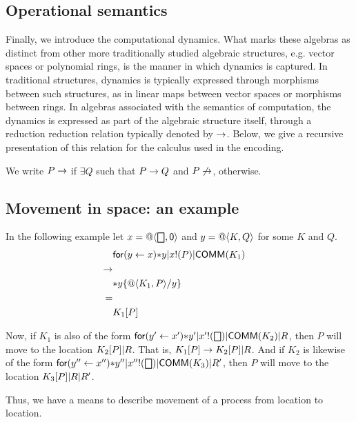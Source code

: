 \subsection{Operational semantics}

Finally, we introduce the computational dynamics. What marks these
algebras as distinct from other more traditionally studied algebraic
structures, e.g. vector spaces or polynomial rings, is the manner in
which dynamics is captured. In traditional structures, dynamics is typically
expressed through morphisms between such structures, as in linear maps
between vector spaces or morphisms between rings. In algebras
associated with the semantics of computation, the dynamics is
expressed as part of the algebraic structure itself, through a
reduction reduction relation typically denoted by $\red$. Below, we
give a recursive presentation of this relation for the calculus used
in the encoding.


We write $P\red$ if $\exists Q $ such that $ P \red Q$ and $P\not\red$, otherwise.

\subsection{ Movement in space: an example }
In the following example let $x = \spacen{\bigbox}{\pzero}$ and $y = \spacen{K}{Q}$ for some $K$ and $Q$.
\begin{eqnarray*}
  & \binpar{\binpar{\prefix{x}{y}{\dropn{y}}}{\outputp{x}{P}}}{\mathsf{COMM}(K_{1})} & \\
  \red & & \\
  & \dropn{y}\substn{\spacen{K_{1}}{P}}{y} & \\
  = & & \\
  & K_{1}[P] &
\end{eqnarray*}

Now, if $K_{1}$ is also of the form $\binpar{\binpar{\binpar{\prefix{x'}{y'}{\dropn{y'}}}{\outputp{x'}{\bigbox}}}{\mathsf{COMM}(K_{2})}}{R}$, then $P$ will move to the location $\binpar{K_{2}[P]}{R}$. That is, $K_{1}[P] \red \binpar{K_{2}[P]}{R}$. And if $K_{2}$ is likewise of the form $\binpar{\binpar{\binpar{\prefix{x''}{y''}{\dropn{y''}}}{\outputp{x''}{\bigbox}}}{\mathsf{COMM}(K_{3})}}{R'}$, then $P$ will move to the location $\binpar{K_{3}[P]}{\binpar{R}{R'}}$.

Thus, we have a means to describe movement of a process from location to location.

